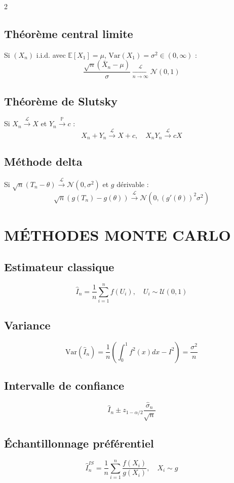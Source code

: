 \documentclass[10pt,a4paper]{article}
\begin{document}
\begin{multicols}{2}
\subsection*{Théorème central limite}
Si $(X_n)$ i.i.d. avec $\mathbb{E}[X_1] = \mu$, $\text{Var}(X_1) = \sigma^2 \in (0, \infty)$ :
\[
\frac{\sqrt{n}(\bar{X}_n - \mu)}{\sigma} \xrightarrow[n \to \infty]{\mathcal{L}} \mathcal{N}(0,1)
\]

\subsection*{Théorème de Slutsky}
Si $X_n \xrightarrow{\mathcal{L}} X$ et $Y_n \xrightarrow{\mathbb{P}} c$ :
\[
X_n + Y_n \xrightarrow{\mathcal{L}} X + c, \quad X_n Y_n \xrightarrow{\mathcal{L}} cX
\]

\subsection*{Méthode delta}
Si $\sqrt{n}(T_n - \theta) \xrightarrow{\mathcal{L}} \mathcal{N}(0, \sigma^2)$ et $g$ dérivable :
\[
\sqrt{n}(g(T_n) - g(\theta)) \xrightarrow{\mathcal{L}} \mathcal{N}(0, (g'(\theta))^2 \sigma^2)
\]

\section*{MÉTHODES MONTE CARLO}

\subsection*{Estimateur classique}
\[
\hat{I}_n = \frac{1}{n} \sum_{i=1}^n f(U_i), \quad U_i \sim \mathcal{U}(0,1)
\]

\subsection*{Variance}
\[
\text{Var}(\hat{I}_n) = \frac{1}{n} \left(\int_0^1 f^2(x) dx - I^2\right) = \frac{\sigma^2}{n}
\]

\subsection*{Intervalle de confiance}
\[
\hat{I}_n \pm z_{1-\alpha/2} \frac{\hat{\sigma}_n}{\sqrt{n}}
\]

\subsection*{Échantillonnage préférentiel}
\[
\hat{I}_n^{IS} = \frac{1}{n} \sum_{i=1}^n \frac{f(X_i)}{g(X_i)}, \quad X_i \sim g
\]


\end{multicols}
\end{document}
